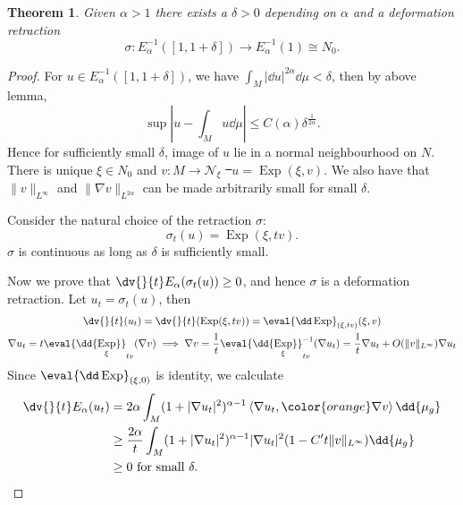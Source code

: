\documentclass[UTF8,12pt]{article}
\theoremstyle{plain}\newtheorem{theorem}{Theorem}
\theoremstyle{definition}\newtheorem{definition}[theorem]{Definition}
\theoremstyle{definition}\newtheorem{example}[theorem]{Example}
\theoremstyle{plain}\newtheorem{axiom}[theorem]{Axiom}
\theoremstyle{plain}\newtheorem{assertion}[theorem]{Assertion}
\theoremstyle{plain}\newtheorem{corollary}[theorem]{Corollary}
\theoremstyle{plain}\newtheorem{lemma}[theorem]{Lemma}
\theoremstyle{plain}\newtheorem{proposition}[theorem]{Proposition}
\theoremstyle{plain}\newtheorem{prop}[theorem]{Proposition}
\theoremstyle{plain}\newtheorem{conjecture}[theorem]{Conjecture}
\theoremstyle{plain}\newtheorem{conj}[theorem]{Conjecture}
\theoremstyle{plain}\newtheorem{problem}[theorem]{Problem}
\theoremstyle{remark}\newtheorem{notation}[theorem]{Notation}
\theoremstyle{definition}\newtheorem*{question}{Question}
\theoremstyle{definition}\newtheorem*{answer}{Answer}
\theoremstyle{definition}\newtheorem*{goal}{Goal}
\theoremstyle{plain}\newtheorem*{application}{Application}
\theoremstyle{plain}\newtheorem*{exercise}{Exercise}
\theoremstyle{remark}\newtheorem*{remark}{Remark}
\theoremstyle{remark}\newtheorem*{note}{\small{Note}}
\numberwithin{equation}{section}
\numberwithin{theorem}{section}
\numberwithin{figure}{section}
\DeclareMathOperator{\Exp}{Exp}
\begin{document}
\begin{theorem}\label{thm:low-energy-retraction}
    Given \(\alpha>1\) there exists a \(\delta>0\) depending on \(\alpha\) and a
    deformation retraction \[
        \sigma\colon E_\alpha^{-1}([1,1+\delta])\longrightarrow E_\alpha^{-1}(1)
        \cong N_0
    .\] 
\end{theorem}
\begin{proof}
    For \(u\in E_\alpha^{-1}([1,1+\delta])\), we have \(\int_{M}|\dd{u}|^{2\alpha}
    \dd{\mu}<\delta\), then by above lemma, \[
        \sup \left|u-\int_{M}u\dd{\mu}\right|\le C(\alpha)\delta^{\frac{1}{2\alpha}}
    .\] Hence for sufficiently small \(\delta\), image of \(u\) lie in a normal
    neighbourhood on \(N\). There is unique \(\xi\in N_0\) and \(v\colon M\to
    \mathcal{N}_{\xi}\) \st\ \(u=\Exp(\xi,v)\). We also have that \(\|v\|_{L^\infty}\)
    and \(\|\nabla v\|_{L^{2\alpha}}\) can be made arbitrarily small for small
    \(\delta\).

    Consider the natural choice of the retraction \(\sigma\): \[
        \sigma_t(u)=\Exp(\xi,tv)
    .\] \(\sigma\) is continuous as long as \(\delta\) is sufficiently small.

    Now we prove that \(\dv{}{t}E_\alpha(\sigma_t(u))\ge 0\), and hence \(\sigma\) is a
    deformation retraction. Let \(u_t=\sigma_t(u)\), then
    \begin{gather*}
        \dv{}{t}(u_t)=\dv{}{t}(\Exp(\xi,tv))=\eval{\dd\Exp}_{(\xi,tv)}(\xi,v) \\
        \nabla u_t=t\eval{\dd{\Exp_\xi}}_{tv}(\nabla v)
        \implies \nabla v=\frac{1}{t}\eval{\dd{\Exp_\xi}}_{tv}^{-1}(\nabla u_t)
        =\frac{1}{t}\nabla u_t+O(\|v\|_{L^\infty})\nabla u_t
    \end{gather*}
    Since \(\eval{\dd\Exp}_{(\xi,0)}\) is identity, we calculate
    \begin{align*}
        \dv{}{t}E_\alpha(u_t)&=2\alpha\int_{M}(1+|\nabla u_t|^2)^{\alpha-1}
        \left<\nabla u_t,{\color{orange}\nabla v}\right> \dd{\mu_g} \\
        &\ge \frac{2\alpha}{t}\int_{M}(1+|\nabla u_t|^2)^{\alpha-1}|\nabla u_t|^2
        (1-C't\|v\|_{L^\infty})\dd{\mu_g} \\
        &\ge 0\text{ for small }\delta
    .\end{align*}
\end{proof}
\end{document}
